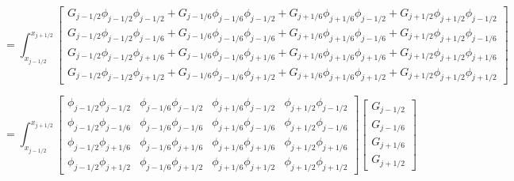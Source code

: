 \documentclass{article}
\begin{document}
\begin{equation}
= \int_{x_{j-1/2}}^{x_{j+1/2}} \begin{bmatrix}
G_{j-1/2}\phi_{j-1/2}\phi_{j-1/2} + G_{j-1/6}\phi_{j-1/6}\phi_{j-1/2} + G_{j+1/6}\phi_{j+1/6}\phi_{j-1/2}  + G_{j+1/2}\phi_{j+1/2}\phi_{j-1/2} \\
G_{j-1/2}\phi_{j-1/2}\phi_{j-1/6} + G_{j-1/6}\phi_{j-1/6}\phi_{j-1/6} + G_{j+1/6}\phi_{j+1/6}\phi_{j-1/6}  + G_{j+1/2}\phi_{j+1/2}\phi_{j-1/6} \\
G_{j-1/2}\phi_{j-1/2}\phi_{j+1/6} + G_{j-1/6}\phi_{j-1/6}\phi_{j+1/6} + G_{j+1/6}\phi_{j+1/6}\phi_{j+1/6}  + G_{j+1/2}\phi_{j+1/2}\phi_{j+1/6} \\
G_{j-1/2}\phi_{j-1/2}\phi_{j+1/2} + G_{j-1/6}\phi_{j-1/6}\phi_{j+1/2} + G_{j+1/6}\phi_{j+1/6}\phi_{j+1/2}  + G_{j+1/2}\phi_{j+1/2}\phi_{j+1/2} 
\end{bmatrix}
\end{equation}

\begin{equation}
= \int_{x_{j-1/2}}^{x_{j+1/2}} \begin{bmatrix}
\phi_{j-1/2}\phi_{j-1/2} & \phi_{j-1/6}\phi_{j-1/2} & \phi_{j+1/6}\phi_{j-1/2}  & \phi_{j+1/2}\phi_{j-1/2} \\
\phi_{j-1/2}\phi_{j-1/6} & \phi_{j-1/6}\phi_{j-1/6} & \phi_{j+1/6}\phi_{j-1/6} & \phi_{j+1/2}\phi_{j-1/6} \\
\phi_{j-1/2}\phi_{j+1/6} & \phi_{j-1/6}\phi_{j+1/6} & \phi_{j+1/6}\phi_{j+1/6}  & \phi_{j+1/2}\phi_{j+1/6} \\
\phi_{j-1/2}\phi_{j+1/2} & \phi_{j-1/6}\phi_{j+1/2} & \phi_{j+1/6}\phi_{j+1/2}  & \phi_{j+1/2}\phi_{j+1/2} 
\end{bmatrix} \begin{bmatrix}
G_{j-1/2} \\ G_{j-1/6} \\ G_{j+1/6}   \\ G_{j+1/2}
\end{bmatrix} 
\end{equation}
\end{document}
